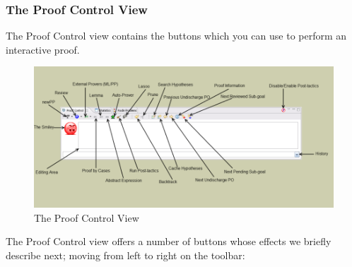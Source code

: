 \subsubsection{The Proof Control View}

The \textsf{Proof Control view} contains the buttons which you can use to perform an interactive proof. 

\begin{figure}[!h]
\begin{center}
	\includegraphics{img/reference/ref_01_proving_perspective6.png}
	\caption{The Proof Control View}
	\label{fig_ref_01_proving_perspective6}
\end{center}
\end{figure}

The Proof Control view offers a number of buttons whose effects we briefly describe next; moving from left to right on the toolbar:

